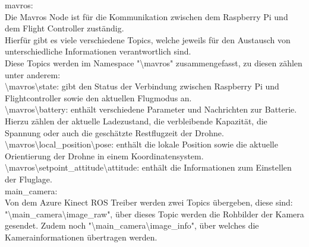 mavros: \\
Die Mavros Node ist für die Kommunikation zwischen dem Raspberry Pi und dem Flight Controller zuständig.\\
Hierfür gibt es viele verschiedene Topics, welche jeweils für den Austausch von unterschiedliche Informationen verantwortlich sind.\\
Diese Topics werden im Namespace "\textbackslash mavros" zusammengefasst, zu diesen zählen unter anderem:\\
\textbackslash mavros\textbackslash state: gibt den Status der Verbindung zwischen Raspberry Pi und Flightcontroller sowie den aktuellen Flugmodus an.\\
\textbackslash mavros\textbackslash battery: enthält verschiedene Parameter und Nachrichten zur Batterie. Hierzu zählen der aktuelle Ladezustand, die verbleibende Kapazität, die Spannung oder auch die geschätzte Restflugzeit der Drohne.\\
\textbackslash mavros\textbackslash local\_position\textbackslash pose: enthält die lokale Position sowie die aktuelle Orientierung der Drohne in einem Koordinatensystem.\\
\textbackslash mavros\textbackslash setpoint\_attitude\textbackslash attitude: enthält die Informationen zum Einstellen der Fluglage. \cite[vgl.][]{mavros}\\
 
main\_camera: \\
Von dem Azure Kinect ROS Treiber werden zwei Topics übergeben, diese sind: \\
"\textbackslash main\_camera\textbackslash image\_raw", über dieses Topic werden die Rohbilder der Kamera gesendet. Zudem noch "\textbackslash main\_camera\textbackslash image\_info", über welches die Kamerainformationen übertragen werden. \cite[vgl.][]{kinect_ros_driver}\\


